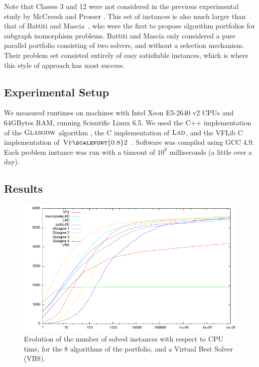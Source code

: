 \documentclass{llncs}
\newcommand{\VFtwo}{$\textsc{Vf{\scalefont{0.8}2}}$\xspace}
\newcommand{\Glasgow}{$\textsc{Glasgow}$\xspace}
\newcommand{\LAD}{$\textsc{Lad}$\xspace}
\begin{document}
Note that Classes 3 and 12 were not considered in the previous experimental study by McCreesh and
Prosser \cite{McCreesh:2015}.  This set of instances is also much larger than that of Battiti and
Mascia~\cite{battiti-mascia07}, who were the first to propose algorithm portfolios for subgraph
isomorphism problems.  Battiti and Mascia only considered a pure parallel portfolio consisting of
two solvers, and without a selection mechanism. Their problem set consisted entirely of easy
satisfiable instances, which is where this style of approach has most success.

\subsection{Experimental Setup}

We measured runtimes on machines with Intel Xeon E5-2640 v2 CPUs and 64GBytes RAM, running
Scientific Linux 6.5. We used the C++ implementation of the \Glasgow algorithm \cite{McCreesh:2015},
the C implementation of \LAD \cite{Solnon:2010}, and the VFLib C implementation of \VFtwo
\cite{Cordella:2004}. Software was compiled using GCC 4.9. Each problem instance was run with a
timeout of $10^8$ milliseconds (a little over a day).


\subsection{Results} \label{expComp}

\begin{figure}[t]
\includegraphics[width=\textwidth]{courbe.pdf}
\caption{Evolution of the number of solved instances with respect to CPU time, for the 8 algorithms
of the portfolio, and a Virtual Best Solver (VBS).\label{expTimeGraph}}
\end{figure}
\end{document}
